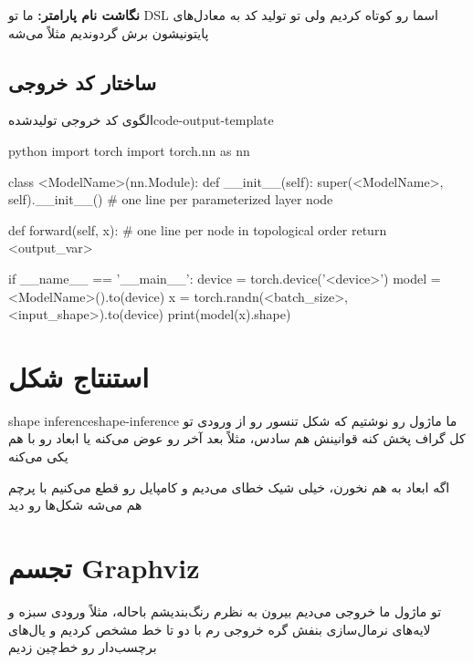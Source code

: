 \documentclass{nngraph-fa}
\begin{document}
\begin{notebox}
\textbf{نگاشت نام پارامتر:} ما تو DSL اسما رو کوتاه کردیم ولی تو تولید کد به معادل‌های پایتونیشون برش گردوندیم
مثلاً  می‌شه 
\end{notebox}

\subsection{ساختار کد خروجی}

\begin{codebox}{الگوی کد خروجی تولیدشده}{code-output-template}
\begin{amzcode}{python}
import torch
import torch.nn as nn


class <ModelName>(nn.Module):
    def __init__(self):
        super(<ModelName>, self).__init__()
        # one line per parameterized layer node

    def forward(self, x):
        # one line per node in topological order
        return <output_var>


if __name__ == '__main__':
    device = torch.device('<device>')
    model  = <ModelName>().to(device)
    x      = torch.randn(<batch_size>, <input_shape>).to(device)
    print(model(x).shape)
\end{amzcode}
\end{codebox}

\section{استنتاج شکل}

\begin{dfnbox}{shape inference}{shape-inference}
ما ماژول  رو نوشتیم که شکل تنسور رو از ورودی تو کل گراف پخش کنه
قوانینش هم سادس، مثلاً  بعد آخر رو عوض می‌کنه یا  ابعاد رو با هم یکی می‌کنه
\end{dfnbox}

اگه ابعاد به هم نخورن، خیلی شیک خطای  می‌دیم و کامپایل رو قطع می‌کنیم
با پرچم  هم می‌شه شکل‌ها رو دید

\section{تجسم Graphviz}

تو ماژول  ما خروجی  می‌دیم بیرون
به نظرم رنگ‌بندیشم باحاله، مثلاً ورودی سبزه و لایه‌های نرمال‌سازی بنفش
گره خروجی رم با دو تا خط مشخص کردیم و یال‌های برچسب‌دار رو خط‌چین زدیم
\end{document}
